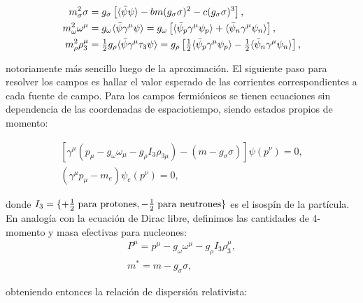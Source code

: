 \begin{equation}
	\begin{aligned}
		m_\sigma^2 \sigma &= g_\sigma \left[\langle \bar{\psi} \psi \rangle - bm(g_\sigma\sigma)^2 - c(g_\sigma\sigma)^3\right], \\
		m_\omega^2 \omega^\mu &= g_{\omega} \langle \bar{\psi} \gamma^\mu \psi \rangle = g_\omega \left[\langle \bar{\psi}_p \gamma^\mu \psi_p \rangle + \langle \bar{\psi}_n \gamma^\mu \psi_n \rangle \right], \\
		m_\rho^2 \rho_3^\mu &= \tfrac{1}{2} g_{\rho} \langle \bar{\psi} \gamma^\mu \tau_3 \psi \rangle = g_\rho \left[\tfrac{1}{2} \langle \bar{\psi}_p \gamma^\mu \psi_p \rangle - \tfrac{1}{2} \langle \bar{\psi}_n \gamma^\mu \psi_n \rangle \right],
		\label{eq:eom_meson_mf}
	\end{aligned}
\end{equation}

notoriamente más sencillo luego de la aproximación. El siguiente paso para resolver los campos es hallar el valor esperado de las corrientes correspondientes a cada fuente de campo. Para los campos fermiónicos se tienen ecuaciones sin dependencia de las coordenadas de espaciotiempo, siendo estados propios de momento:

\begin{equation}
	\begin{gathered}
		\left[ \gamma^\mu \left( p_\mu - g_{\omega} \omega_\mu - g_{\rho} I_3 \rho_{3\mu} \right) - (m - g_{\sigma} \sigma) \right] \psi(p^\nu) = 0, \\
		(\gamma^\mu p_\mu - m_e) \psi_e(p^\nu) = 0,
		\label{eq:eom_fermion_mf}
	\end{gathered}
\end{equation}

donde $I_3 = \{+\tfrac{1}{2} \; \text{para protones}, -\tfrac{1}{2} \; \text{para neutrones}\}$ es el isospín de la partícula. En analogía con la ecuación de Dirac libre, definimos las cantidades de 4-momento y masa efectivas para nucleones:
\begin{equation}
	\begin{gathered}
		P^\mu = p^\mu - g_{\omega} \omega^\mu - g_{\rho} I_3 \rho_{3}^\mu,\\
		m^* = m - g_\sigma \sigma,
	\end{gathered}	
\end{equation}

obteniendo entonces la relación de dispersión relativista:

